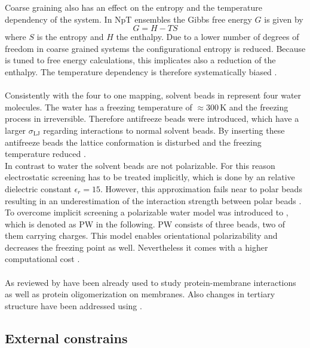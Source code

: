 Coarse graining also has an effect on the entropy and the temperature dependency of the system. In NpT ensembles the Gibbs free energy $G$ is given by
\begin{equation}
G = H - T S
\end{equation}
where $S$ is the entropy and $H$ the enthalpy. Due to a lower number of degrees of freedom in coarse grained systems the configurational entropy is reduced. Because \martini{} is tuned to free energy calculations, this implicates also a reduction of the enthalpy. The temperature dependency is therefore systematically biased \autocite{martini22_check}.\\ 
\\
Consistently with the four to one mapping, solvent beads in \martini{} represent four water molecules. The \martini{} water has a freezing temperature of $\approx 300\,\si{\kelvin}$ and the freezing process in irreversible. Therefore antifreeze beads were introduced, which have a larger $\sigma_\text{LJ}$ regarding interactions to normal solvent beads. By inserting these antifreeze beads the lattice conformation is disturbed and the freezing temperature reduced \autocite{martini}.\\
In contrast to water the solvent beads are not polarizable. For this reason electrostatic screening has to be treated implicitly, which is done by an relative dielectric constant $\epsilon_r = 15$. However, this approximation fails near to polar beads resulting in an underestimation of the interaction strength between polar beads \autocite{martini22_check}. %
To overcome implicit screening a polarizable water model was introduced to \martini{}, which is denoted as PW in the following. PW consists of three beads, two of them carrying charges. This model enables orientational polarizability and decreases the freezing point as well. Nevertheless it comes with a higher computational cost \autocite{polarizableMartini}.\\
\\
As reviewed by \textcite{martini22_check} \martini{} have been already used to study protein-membrane interactions as well as protein oligomerization on membranes. Also changes in tertiary structure have been addressed using \martini{}.%
\subsection{External constrains}
